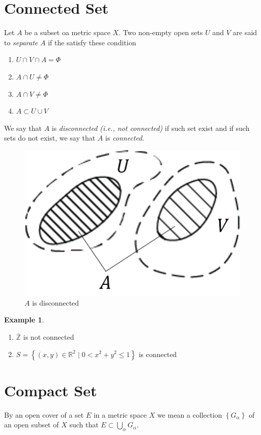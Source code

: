\documentclass[12pt,oneside,a4paper]{book}
\newcommand{\R}{\mathds{R}}
\newcommand{\Z}{\mathds{Z}}
\newcommand{\set}[1]{\left\{#1\right\}}
\theoremstyle{remark}
\theoremstyle{definition}
\newtheorem*{ex}{Example}
\begin{document}
\section{Connected Set}
Let $ A $ be a subset oa metric space $ X $. Two non-empty open sets $ U $ and $ V $ are said to \emph{separate} $ A $ if the satisfy these condition
\begin{enumerate}[noitemsep]
    \item $ U\cap V\cap A=\Phi $
    \item $ A\cap U\neq\Phi $
    \item $ A\cap V\neq \Phi $
    \item $ A\subset U\cup V $
\end{enumerate}
We say that $ A  $ is \emph{disconnected (i.e., not connected)} if such set exist and if such sets do not exist, we say that $ A $ is \emph{connected}.
\begin{figure}[H]
    \centering
    \includegraphics{Picture2.png}
    \caption{$ A $ is disconnected}
    \label{fig:conSet}
\end{figure}
\begin{ex}
    \hfill
    \begin{enumerate}
        \item $ \bar{\Z} $ is not connected
        \item $ S=\set{(x,y)\in\R^2\mid 0<x^2+y^2\leq 1} $ is connected
    \end{enumerate}
\end{ex}
\section{Compact Set}
By an open cover of a set $ E $ in a metric space $ X $ we mean a collection $ \set{G_\alpha} $ of an open subset of $ X $ such that $ E\subset \bigcup_\alpha G_\alpha $.
\end{document}
